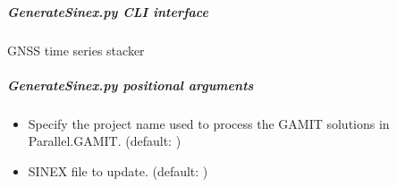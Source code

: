 \documentclass[letterpaper,10pt,english]{sphinxmanual}
\begin{document}
\begin{fulllineitems}
\label{\detokenize{pgamit.com:pgamit.com.GenerateSinex.process_sinex}}
\pysigstartsignatures
\pysiglinewithargsret
{}
{\sphinxparamcomma {}\sphinxparamcomma {}\sphinxparamcomma {}}
{}
\pysigstopsignatures
\end{fulllineitems}


\begin{fulllineitems}
\label{\detokenize{pgamit.com:pgamit.com.GenerateSinex.replace_in_sinex}}
\pysigstartsignatures
\pysiglinewithargsret
{}
{\sphinxparamcomma {}\sphinxparamcomma {}\sphinxparamcomma {}}
{}
\pysigstopsignatures
\end{fulllineitems}



\subparagraph{GenerateSinex.py \sphinxhyphen{} CLI interface}
\label{\detokenize{pgamit.com:GenerateSinex.py---CLI-interface}}
\sphinxAtStartPar
GNSS time series stacker

\begin{sphinxVerbatim}[commandchars=\\\{\}]
 \PYG{p}{[}\PYG{p}{]} \PYG{p}{[}  \PYG{p}{[} \PYG{p}{]}\PYG{p}{]}    
\end{sphinxVerbatim}


\subparagraph{GenerateSinex.py positional arguments}
\label{\detokenize{pgamit.com:GenerateSinex.py-positional-arguments}}\begin{itemize}
\item {} 
\sphinxAtStartPar
{\hyperref[\detokenize{pgamit.com:GenerateSinex.py-_project-name_}]{}} \sphinxhyphen{} Specify the project name used to process the GAMIT solutions in Parallel.GAMIT. (default: )

\item {} 
\sphinxAtStartPar
{\hyperref[\detokenize{pgamit.com:GenerateSinex.py-_project-name_}]{}} \sphinxhyphen{} SINEX file to update. (default: )

\end{itemize}
\end{document}
